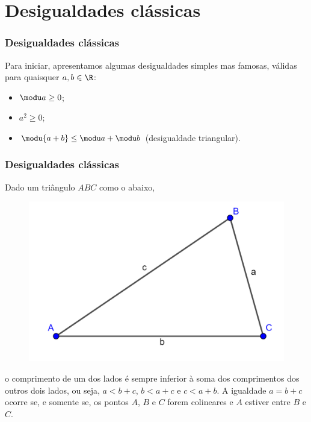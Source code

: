 
\section{Desigualdades clássicas}
\begin{frame}
\frametitle{Desigualdades clássicas} 

Para iniciar, apresentamos algumas desigualdades simples mas
famosas, válidas para quaisquer $a,b \in \R$:
\begin{itemize}
	\item $\modu a \geq 0$;
	\item $a^2 \geq 0$;
	\item $\modu {a+b} \leq \modu a + \modu b$ (desigualdade triangular).
\end{itemize}

\end{frame}
\begin{frame}
\frametitle{Desigualdades clássicas} 

\begin{teorema}
	Dado um triângulo $ABC$ como o abaixo,
	\label{fig:destri1}
	\begin{figure}[H]
	\includegraphics[scale=0.24]{figures/DesTriang1.png}
	\centering
	\end{figure}
	o comprimento de um dos lados é sempre inferior à soma dos comprimentos dos outros dois lados, ou seja, $a< b+c$, $b<a+c$ e $c< a+b$. A igualdade $a = b+c$ ocorre se, e somente se, os pontos $A$, $B$ e $C$ forem colineares e $A$ estiver entre $B$ e $C$.
\end{teorema}

\end{frame}
